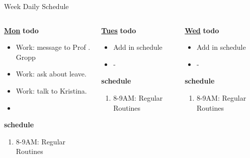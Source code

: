 \begin{frame}
\begin{columns}
\begin{column}{0.5\linewidth}
\begin{block}{Week Daily Schedule}
        \begin{columns}
          \begin{column}{0.14\textwidth}{\small \underline{\bf Mon}}
            {\small \bf todo}\\ 
            \begin{itemize}
              \tiny \item \tiny Work: message to Prof . Gropp 
            \item \tiny Work: ask about leave. 
            \item \tiny Work: talk to Kristina. 
            \item \tiny 
            \end{itemize} 
                {\small  \bf schedule}\\
                \begin{enumerate} 
                  \tiny \item \tiny 8-9AM: Regular Routines 
                \end{enumerate}
          \end{column} 
          
          \begin{column}{0.14\textwidth}{\small \underline{\bf Tues}}
            {\small {\bf todo}}\\ 
            \begin{itemize}
              \tiny \item \tiny Add in schedule
            \item \tiny -
            \end{itemize} 
                {\small {\bf schedule}}
                \begin{enumerate} 
                  \tiny \item \tiny 8-9AM: Regular Routines 
                \end{enumerate} 
          \end{column}

          \begin{column}{0.14\textwidth}{\small \underline{\bf Wed}}
            \small{\bf todo}\\
            \begin{itemize}
              \tiny \item \tiny Add in schedule
            \item \tiny -
            \end{itemize} 
                {\small {\bf schedule}}\\
                \begin{enumerate} 
                  \tiny \item \tiny 8-9AM: Regular Routines 
                \end{enumerate} 
          \end{column}


\end{columns}
\end{block}
\end{column}
\end{columns}
\end{frame}
